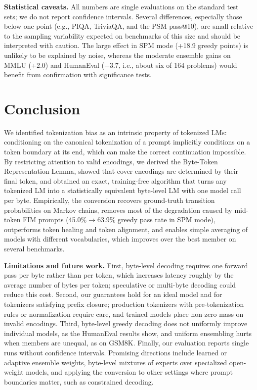 \documentclass{article} %
\begin{document}
\textbf{Statistical caveats.} All numbers are single evaluations on the standard test sets; we do not report confidence intervals. Several differences, especially those below one point (e.g., PIQA, TriviaQA, and the PSM pass@10), are small relative to the sampling variability expected on benchmarks of this size and should be interpreted with caution. The large effect in SPM mode (+18.9 greedy points) is unlikely to be explained by noise, whereas the moderate ensemble gains on MMLU (+2.0) and HumanEval (+3.7, i.e., about six of 164 problems) would benefit from confirmation with significance tests.

\section{Conclusion}
\label{sec:conclusion}
We identified tokenization bias as an intrinsic property of tokenized LMs: conditioning on the canonical tokenization of a prompt implicitly conditions on a token boundary at its end, which can make the correct continuation impossible. By restricting attention to valid encodings, we derived the Byte-Token Representation Lemma, showed that cover encodings are determined by their final token, and obtained an exact, training-free algorithm that turns any tokenized LM into a statistically equivalent byte-level LM with one model call per byte. Empirically, the conversion recovers ground-truth transition probabilities on Markov chains, removes most of the degradation caused by mid-token FIM prompts (45.0\%$\to$63.9\% greedy pass rate in SPM mode), outperforms token healing and token alignment, and enables simple averaging of models with different vocabularies, which improves over the best member on several benchmarks.

\textbf{Limitations and future work.} First, byte-level decoding requires one forward pass per byte rather than per token, which increases latency roughly by the average number of bytes per token; speculative or multi-byte decoding could reduce this cost. Second, our guarantees hold for an ideal model and for tokenizers satisfying prefix closure; production tokenizers with pre-tokenization rules or normalization require care, and trained models place non-zero mass on invalid encodings. Third, byte-level greedy decoding does not uniformly improve individual models, as the HumanEval results show, and uniform ensembling hurts when members are unequal, as on GSM8K. Finally, our evaluation reports single runs without confidence intervals. Promising directions include learned or adaptive ensemble weights, byte-level mixtures of experts over specialized open-weight models, and applying the conversion to other settings where prompt boundaries matter, such as constrained decoding.
\end{document}
